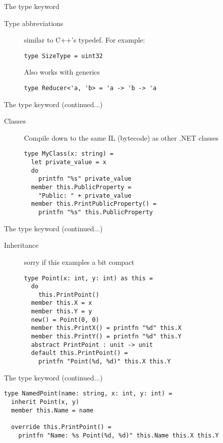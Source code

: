 \documentclass[landscape]{slides}
\begin{document}
\begin{slide}{The type keyword}
\begin{description}
\item[Type abbreviations] similar to C++'s typedef. For example:
\begin{verbatim}
type SizeType = uint32
\end{verbatim}
Also works with generics
\begin{verbatim}
type Reducer<'a, 'b> = 'a -> 'b -> 'a
\end{verbatim}
\end{description}
\end{slide}

\begin{slide}{The type keyword (continued...)}
\begin{description}
\item[Classes] Compile down to the same IL (bytecode) as other .NET classes
\begin{verbatim}
type MyClass(x: string) =        
  let private_value = x
  do
    printfn "%s" private_value
  member this.PublicProperty = 
    "Public: " + private_value
  member this.PrintPublicProperty() =
    printfn "%s" this.PublicProperty
\end{verbatim}
\end{description}
\end{slide}

\begin{slide}{The type keyword (continued...)}
\begin{description}
\item[Inheritance] sorry if this examples a bit compact 
\begin{verbatim}
type Point(x: int, y: int) as this =
  do
    this.PrintPoint()
  member this.X = x
  member this.Y = y
  new() = Point(0, 0)
  member this.PrintX() = printfn "%d" this.X
  member this.PrintY() = printfn "%d" this.Y
  abstract PrintPoint : unit -> unit
  default this.PrintPoint() = 
    printfn "Point(%d, %d)" this.X this.Y
\end{verbatim}
\end{description}
\end{slide}

\begin{slide}{The type keyword (continued...)}
\begin{description}
\begin{verbatim}
type NamedPoint(name: string, x: int, y: int) =
  inherit Point(x, y)
  member this.Name = name

  override this.PrintPoint() =
    printfn "Name: %s Point(%d, %d)" this.Name this.X this.Y
\end{verbatim}
\end{description}
\end{slide}
\end{document}
